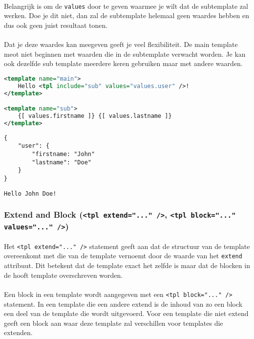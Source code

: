 \paragraph {} Belangrijk is om de \lstinline{values} door te geven waarmee je wilt dat de
subtemplate zal werken. Doe je dit niet, dan zal de subtemplate helemaal geen waardes
hebben en dus ook geen juist resultaat tonen.

\paragraph {} Dat je deze waardes kan meegeven geeft je veel flexibiliteit. De main
template meot niet beginnen met waarden die in de subtemplate verwacht worden. Je kan ook
dezelfde sub template meerdere keren gebruiken maar met andere waarden.

\begin{lstlisting}[language=xml]
<template name="main">
	Hello <tpl include="sub" values="values.user" />!
</template>

<template name="sub">
	{[ values.firstname ]} {[ values.lastname ]}
</template>
\end{lstlisting}

\begin{lstlisting}
{
	"user": {
		"firstname: "John"
		"lastname": "Doe"
	}
}
\end{lstlisting}

\begin{lstlisting}
Hello John Doe!
\end{lstlisting}


\subsubsection {Extend and Block (\lstinline{<tpl extend="..." />}, \lstinline{<tpl block="..." values="..." />})}

\paragraph {} Het \lstinline{<tpl extend="..." />} statement geeft aan dat de structuur
van de template overeenkomt met die van de template vernoemt door de waarde van het
\lstinline{extend} attribuut. Dit betekent dat de template exact het zelfde is maar dat de
blocken in de hooft template overschreven worden.

\paragraph {} Een block in een template wordt aangegeven met een
\lstinline{<tpl block="..." />} statement. In een template die een andere extend is de
inhoud van zo een block een deel van de template die wordt uitgevoerd. Voor een template
die niet extend geeft een block aan waar deze template zal verschillen voor templates die
extenden.

